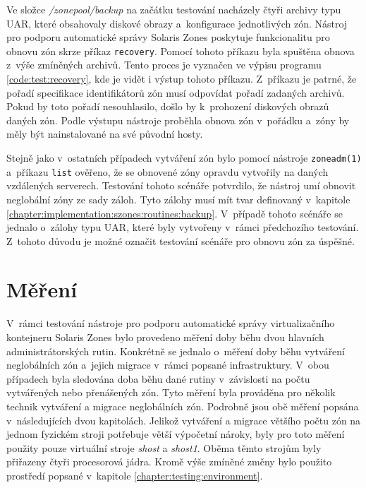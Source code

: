 Ve složce \textit{/zonepool/backup} na začátku testování nacházely čtyři archivy typu UAR, které obsahovaly diskové obrazy
a~konfigurace jednotlivých zón. Nástroj pro podporu automatické správy Solaris Zones poskytuje funkcionalitu pro obnovu zón skrze
příkaz \verb|recovery|. Pomocí tohoto příkazu byla spuštěna obnova z~výše zmíněných archivů. Tento proces je vyznačen ve výpisu
programu \ref{code:test:recovery}, kde je vidět i výstup tohoto příkazu. Z~příkazu je patrné, že pořadí specifikace identifikátorů
zón musí odpovídat pořadí zadaných archivů. Pokud by toto pořadí nesouhlasilo, došlo by k~prohození diskových obrazů daných
zón. Podle výstupu nástroje proběhla obnova zón v~pořádku a~zóny by měly být nainstalované na své původní hosty.

Stejně jako v~ostatních případech vytváření zón bylo pomocí nástroje \verb|zoneadm(1)| a~příkazu \verb|list| ověřeno, že se
obnovené zóny opravdu vytvořily na daných vzdálených serverech. Testování tohoto scénáře potvrdilo, že nástroj umí obnovit
neglobální zóny ze sady záloh. Tyto zálohy musí mít tvar definovaný v~kapitole \ref{chapter:implementation:szones:routines:backup}.
V~případě tohoto scénáře se jednalo o~zálohy typu UAR, které byly vytvořeny v~rámci předchozího testování. Z~tohoto důvodu je možné
označit testování scénáře pro obnovu zón za úspěšné.
\section{Měření}
\label{chapter:measurement}
V~rámci testování nástroje pro podporu automatické správy virtualizačního kontejneru Solaris Zones bylo provedeno měření doby
běhu dvou hlavních administrátorských rutin. Konkrétně se jednalo o~měření doby běhu vytváření neglobálních zón a~jejich migrace
v~rámci popsané infrastruktury. V~obou případech byla sledována doba běhu dané rutiny v~závislosti na počtu vytvářených nebo
přenášených zón. Tyto měření byla prováděna pro několik technik vytváření a migrace neglobálních zón. Podrobně jsou obě měření
popsána v~následujících dvou kapitolách. Jelikož vytváření a migrace většího počtu zón na jednom fyzickém stroji potřebuje větší 
výpočetní nároky, byly pro toto měření použity pouze virtuální stroje \textit{shost} a \textit{shost1}. Oběma těmto strojům byly
přiřazeny čtyři procesorová jádra. Kromě výše zmíněné změny bylo použito prostředí popsané v~kapitole \ref{chapter:testing:environment}.
